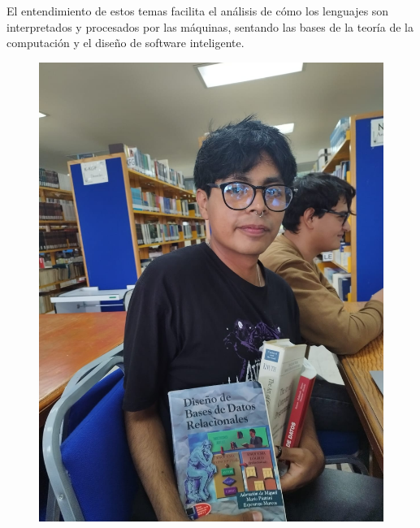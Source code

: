 \documentclass{article}
\begin{document}
El entendimiento de estos temas facilita el análisis de cómo los lenguajes son interpretados y procesados por las máquinas, sentando las bases de la teoría de la computación y el diseño de software inteligente.

\newpage
\newpage

\begin{figure}[!ht]
  \centering
  \begin{minipage}{0.48\textwidth}
    \centering
    \includegraphics[width=0.9\linewidth]{imagenes/Imagen de WhatsApp 2025-10-17 a las 07.08.08_2f0da4f9.jpg}
  \end{minipage}\hfill
  \begin{minipage}{0.48\textwidth}
    \centering

\end{minipage}
\end{figure}
\end{document}
